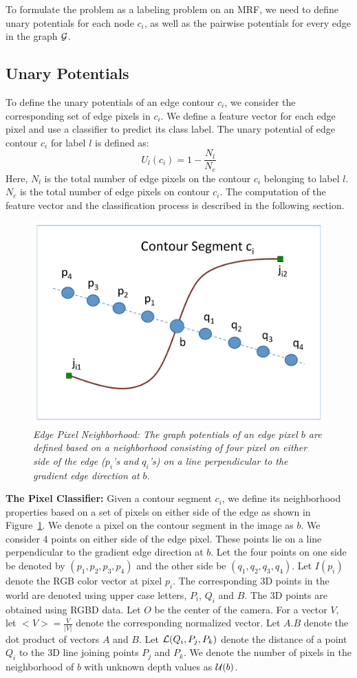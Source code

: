 To formulate the problem as a labeling problem on an MRF, we need to define unary potentials for
each node $c_i$, as well as the pairwise potentials for every edge in the graph ${\cal G}$.

\subsection{Unary Potentials}

To define the unary potentials of an edge contour $c_i$, we consider the corresponding set of
edge pixels in $c_i$. We define a feature vector for each edge pixel and use a classifier to 
predict its class label. The unary potential of edge contour $c_i$ for label $l$ is 
defined as:
\begin{equation}
\label{unary}
U_l(c_i) = 1 - \frac{N_l}{N_c}
\end{equation}
Here, $N_l$ is the total number of edge pixels on the contour $c_i$ belonging to label $l$. $N_c$ is 
the total number of edge pixels on contour $c_i$. The computation of the feature vector and the 
classification process is described in the following section.

\begin{figure}
       \centering
       \includegraphics[width=0.40\columnwidth]{images/edgePixels.pdf}
       \caption{\it Edge Pixel Neighborhood: The graph potentials of an edge pixel $b$ are defined based
       on a neighborhood consisting of four pixel on either side of the edge ($p_i$'s and $q_i$'s) on a 
			line perpendicular to the gradient edge direction at $b$.}
\label{fig:edgeNeighbors}
\end{figure}

{\bf The Pixel Classifier:}
Given a contour segment $c_i$, we define its neighborhood properties based on a set of
pixels on either side of the edge as shown in Figure~\ref{fig:edgeNeighbors}. We denote a 
pixel on the contour segment in the image as $b$. We consider $4$ points on either side of 
the edge pixel. These points lie on a line perpendicular to the gradient edge direction at $b$. 
Let the four points on one side be denoted by $(p_1,p_2,p_3,p_4)$ and the other side be 
$(q_1,q_2,q_3,q_4)$. Let $I(p_i)$ denote the RGB color vector at pixel $p_i$.
The corresponding 3D points in the world are denoted using upper 
case letters, $P_i$, $Q_i$ and $B$. The 3D points are obtained using RGBD data. Let $O$ be the 
center of the camera. For a vector $V$, let $<V> = \frac{V}{|V|}$ denote the corresponding 
normalized vector. Let $A.B$ denote the dot product of vectors $A$ and $B$. 
Let ${\cal L}(Q_i,P_j,P_k)$ denote the distance of a point $Q_i$ to the 
3D line joining points $P_j$ and $P_k$. We denote the number of pixels in the neighborhood of 
$b$ with unknown depth values as ${\cal U}(b)$.
	

